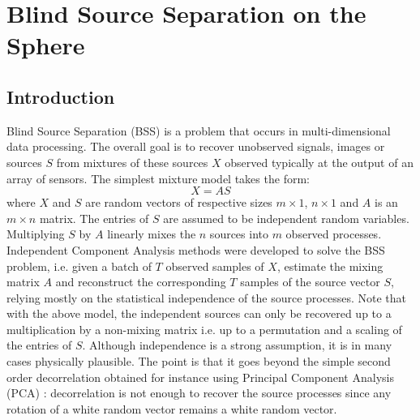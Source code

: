 

\chapter{Blind Source Separation on the Sphere}
\label{ch_mrs_ica}

\section{Introduction}

Blind Source Separation (BSS) is a problem that occurs in multi-dimensional data processing. The overall goal is to recover 
unobserved signals, images or sources $S$ from mixtures of these sources $X$ observed typically at the output of an 
array of sensors. The simplest mixture model takes the form:
\begin{equation}\label{model0}
X = A S
\end{equation}
where $X$ and $S$ are random vectors of respective sizes $m \times 1$, $n \times 1$ and $A$ is an $m \times n$ matrix. The 
entries of $S$ are assumed to be independent random variables. Multiplying $S$ by $A$ linearly mixes the $n$ sources into 
$m$ observed processes. \\ 
   
Independent Component Analysis methods were developed to solve the BSS problem, i.e. given a batch of $T$ observed 
samples of $X$, estimate the mixing matrix $A$ and reconstruct the corresponding $T$ samples of the source vector $S$, relying 
mostly on the statistical independence of the source processes. Note that with the above model, the independent sources can 
only be recovered up to a multiplication by a non-mixing matrix i.e. up to a permutation and a scaling of the 
entries of $S$. Although independence is a strong assumption, it is in many cases physically plausible. The point is that 
it goes beyond the simple second order decorrelation obtained for instance using Principal Component Analysis (PCA) : decorrelation 
is not enough to recover the source processes since any rotation of a white random vector remains a white random vector.\\

